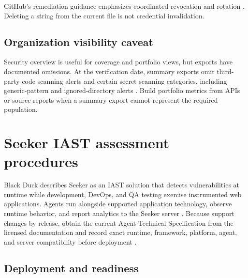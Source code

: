 \documentclass[11pt,letterpaper]{article}
\begin{document}
GitHub's remediation guidance emphasizes coordinated revocation and rotation \citep{githubsecretremediation}. Deleting a string from the current file is not credential invalidation.

\subsection{Organization visibility caveat}

Security overview is useful for coverage and portfolio views, but exports have documented omissions. At the verification date, summary exports omit third-party code scanning alerts and certain secret scanning categories, including generic-pattern and ignored-directory alerts \citep{githuboverviewexport}. Build portfolio metrics from APIs or source reports when a summary export cannot represent the required population.

\section{Seeker IAST assessment procedures}

Black Duck describes Seeker as an IAST solution that detects vulnerabilities at runtime while development, DevOps, and QA testing exercise instrumented web applications. Agents run alongside supported application technology, observe runtime behavior, and report analytics to the Seeker server \citep{seekerintro,seekerinstrumentation}. Because support changes by release, obtain the current Agent Technical Specification from the licensed documentation and record exact runtime, framework, platform, agent, and server compatibility before deployment \citep{seekerfeatures}.

\subsection{Deployment and readiness}
\end{document}
